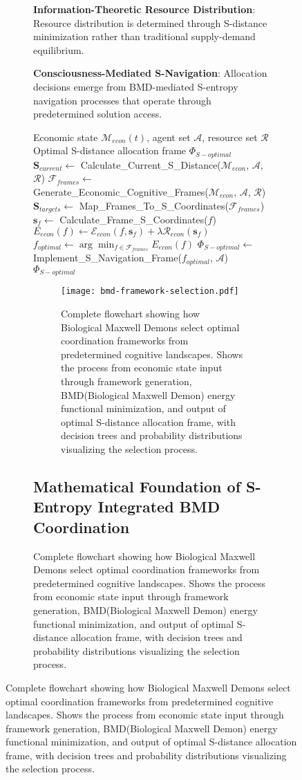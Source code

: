 \documentclass[12pt,a4paper]{article}
\begin{document}
\begin{figure}[H]
\begin{figure}[H]
\textbf{Information-Theoretic Resource Distribution}: Resource distribution is determined through S-distance minimization rather than traditional supply-demand equilibrium.

\textbf{Consciousness-Mediated S-Navigation}: Allocation decisions emerge from BMD-mediated S-entropy navigation processes that operate through predetermined solution access.

\begin{algorithm}
\caption{S-Entropy Integrated BMD Resource Coordination}
\begin{algorithmic}[1]
\Require Economic state $\mathcal{M}_{econ}(t)$, agent set $\mathcal{A}$, resource set $\mathcal{R}$
\Ensure Optimal S-distance allocation frame $\Phi_{S-optimal}$
\State $\mathbf{S}_{current} \leftarrow$ Calculate\_Current\_S\_Distance($\mathcal{M}_{econ}$, $\mathcal{A}$, $\mathcal{R}$)
\State $\mathcal{F}_{frames} \leftarrow$ Generate\_Economic\_Cognitive\_Frames($\mathcal{M}_{econ}$, $\mathcal{A}$, $\mathcal{R}$)
\State $\mathbf{S}_{targets} \leftarrow$ Map\_Frames\_To\_S\_Coordinates($\mathcal{F}_{frames}$)
    \State $\mathbf{s}_f \leftarrow$ Calculate\_Frame\_S\_Coordinates($f$)
    \State $E_{econ}(f) \leftarrow \mathcal{E}_{econ}(f, \mathbf{s}_f) + \lambda \mathcal{R}_{econ}(\mathbf{s}_f)$
\EndFor
\State $f_{optimal} \leftarrow \arg\min_{f \in \mathcal{F}_{frames}} E_{econ}(f)$
\State $\Phi_{S-optimal} \leftarrow$ Implement\_S\_Navigation\_Frame($f_{optimal}$, $\mathcal{A}$)
\Return $\Phi_{S-optimal}$
\end{algorithmic}
\end{algorithm}

\begin{figure}[t]
\centering
\texttt{[image: bmd-framework-selection.pdf]}
\caption{Complete flowchart showing how Biological Maxwell Demons select optimal coordination frameworks from predetermined cognitive landscapes. Shows the process from economic state input through framework generation, BMD(Biological Maxwell Demon) energy functional minimization, and output of optimal S-distance allocation frame, with decision trees and probability distributions visualizing the selection process.}
\label{fig:bmd-framework-selection}
\end{figure}

\subsection{Mathematical Foundation of S-Entropy Integrated BMD Coordination}


\end{figure}
\end{figure}
\end{document}
